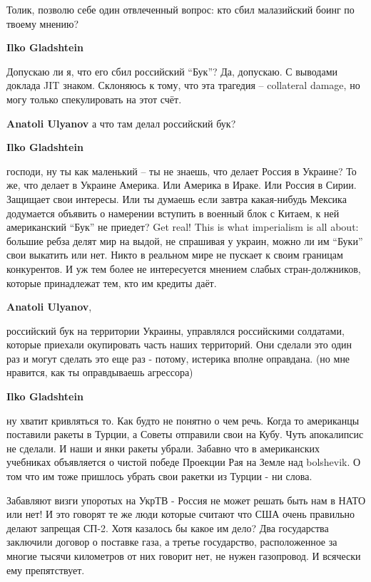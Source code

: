 \begin{itemize}
\begin{itemize}
\end{itemize} %

Толик, позволю себе один отвлеченный вопрос: кто сбил малазийский боинг по твоему мнению?

\begin{itemize} %
\textbf{Ilko Gladshtein} 

Допускаю ли я, что его сбил российский \enquote{Бук}? Да, допускаю. С выводами доклада
JIT знаком. Склоняюсь к тому, что эта трагедия – collateral damage, но могу
только спекулировать на этот счёт.

\textbf{Anatoli Ulyanov} а что там делал российский бук?

\textbf{Ilko Gladshtein} 

господи, ну ты как маленький – ты не знаешь, что делает Россия в Украине? То
же, что делает в Украине Америка. Или Америка в Ираке. Или Россия в Сирии.
Защищает свои интересы. Или ты думаешь если завтра какая-нибудь Мексика
додумается объявить о намерении вступить в военный блок с Китаем, к ней
американский \enquote{Бук} не приедет? Get real! This is what imperialism is all about:
большие ребза делят мир на выдой, не спрашивая у украин, можно ли им \enquote{Буки}
свои выкатить или нет. Никто в реальном мире не пускает к своим границам
конкурентов. И уж тем более не интересуется мнением слабых стран-должников,
которые принадлежат тем, кто им кредиты даёт.

\textbf{Anatoli Ulyanov}, 

российский бук на территории Украины, управлялся российскими солдатами, которые
приехали окупировать часть наших территорий. Они сделали это один раз и могут
сделать это еще раз - потому, истерика вполне оправдана. (но мне нравится, как
ты оправдываешь агрессора)


\textbf{Ilko Gladshtein} 

ну хватит кривляться то. Как будто не понятно о чем речь. Когда то американцы
поставили ракеты в Турции, а Советы отправили свои на Кубу. Чуть апокалипсис не
сделали. И наши и янки ракеты убрали. Забавно что в американских учебниках
объявляется о чистой победе Проекции Рая на Земле над bolshevik. О том что им
тоже пришлось убрать свои ракетки из Турции - ни слова.

Забавляют визги упоротых на УкрТВ - Россия не может решать быть нам в НАТО или
нет! И это говорят те же люди которые считают что США очень правильно делают
запрещая СП-2. Хотя казалось бы какое им дело? Два государства заключили
договор о поставке газа, а третье государство, расположенное за многие тысячи
километров от них говорит нет, не нужен газопровод. И всячески ему
препятствует.


\end{itemize}
\end{itemize}
